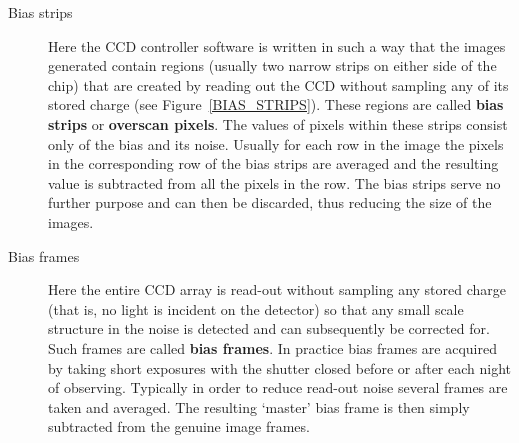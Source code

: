 \documentclass[twoside,11pt]{starlink}
\begin{document}
\begin{description}

  \item[Bias strips] Here the CCD controller software is written in such
   a way that the images generated contain regions (usually two narrow
   strips on either side of the chip) that are created by reading out the
   CCD without sampling any of its stored charge (see
   Figure~\ref{BIAS_STRIPS}). These regions are called \textbf{bias strips}
   or \textbf{overscan pixels}.  The values of pixels within these strips
   consist only of the bias and its noise.  Usually for each row in the
   image the pixels in the corresponding row of the bias strips are
   averaged and the resulting value is subtracted from all the pixels in
   the row.  The bias strips serve no further purpose and can then be
   discarded, thus reducing the size of the images.

  \item[Bias frames] Here the entire CCD array is read-out without sampling
   any stored charge (that is, no light is incident on the detector) so
   that any small scale structure in the noise is detected and can
   subsequently be corrected for.  Such frames are called \textbf{bias frames}.
   In practice bias frames are acquired by taking short exposures with
   the shutter closed before or after each night of observing.  Typically
   in order to reduce read-out noise several frames are taken and averaged.
   The resulting `master' bias frame is then simply subtracted from the
   genuine image frames.

\end{description}
\end{document}
